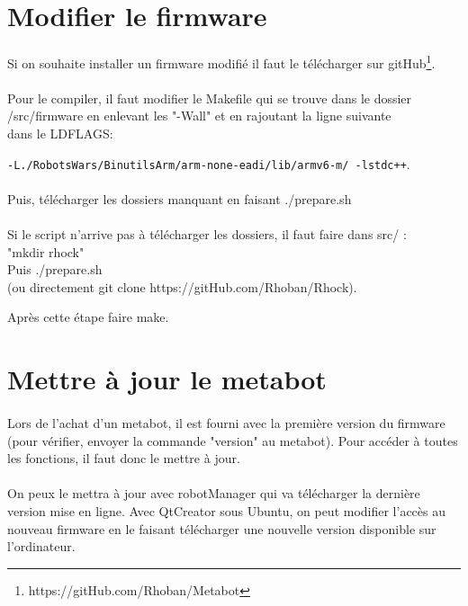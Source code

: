 \documentclass[10pt,a4paper]{report}
\begin{document}
\section{Modifier le firmware}
\paragraph{}

Si on souhaite installer un firmware modifié il faut le télécharger sur  gitHub\footnote{https://gitHub.com/Rhoban/Metabot}.
\paragraph{}
Pour le compiler, il faut modifier le Makefile qui se trouve dans le dossier\\ /src/firmware en enlevant les "-Wall" et en rajoutant la ligne suivante \\dans le LDFLAGS:

\texttt{-L./RobotsWars/BinutilsArm/arm-none-eadi/lib/armv6-m/ -lstdc++}.


\paragraph{}
Puis, télécharger les dossiers manquant en faisant ./prepare.sh
\paragraph{}
Si le script n'arrive pas à télécharger les dossiers, il faut faire dans src/ :\\
"mkdir rhock"  \\
Puis ./prepare.sh \\
(ou directement git clone https://gitHub.com/Rhoban/Rhock).

Après cette étape faire make.

\section{Mettre à jour le metabot}
\paragraph{}
Lors de l'achat d'un metabot, il est fourni avec la première version du firmware (pour vérifier, envoyer la commande "version" au metabot). Pour accéder à toutes les fonctions, il faut donc le mettre à jour.
\paragraph{}
On peux le mettra à jour avec robotManager qui va télécharger la dernière version mise en ligne.
Avec QtCreator sous Ubuntu, on peut modifier l'accès au nouveau firmware en le faisant télécharger une nouvelle version disponible sur l'ordinateur.
\end{document}
